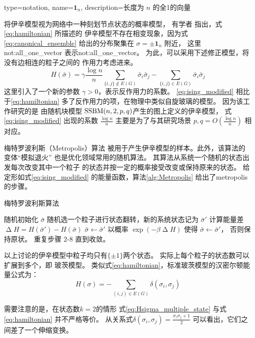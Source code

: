 {
  type=notation,
  name={\ensuremath{\mathbf{1}_n}},
  description={长度为 $n$ 的全1的向量}
}

将伊辛模型视为网络中一种刻划节点状态的概率模型，
有学者\cite{ye2020exact}
指出，式\eqref{eq:hamiltonian} 所描述的
伊辛模型不存在相变现象，因为式\eqref{eq:canonical_ensemble}
给出的分布聚集在 $\sigma=\pm \mathbf{1}_n$ 附近，
这里 \gls{not:all_one_vector} 表示\glsdesc{not:all_one_vector}。
为此，可以采用下述修正模型，将没有边相连的粒子之间的
作用力考虑进来。
\begin{equation}\label{eq:ising_modified}
  H(\bar{\sigma}) = \gamma \frac{\log n}{n} \sum_{\{i,j\}\not\in E(G)}
  \bar{\sigma}_i  \bar{\sigma}_j
	- \sum_{\{i,j\}\in E(G)}
  \bar{\sigma}_i  \bar{\sigma}_j
\end{equation}
这里引入了一个新的参数 $\gamma > 0$，表示反作用力的系数。
\eqref{eq:ising_modified}
相比于\eqref{eq:hamiltonian}
多了反作用力的项，在物理中类似自旋玻璃的模型\cite{lenka2016physics}。
因为该工作研究的是
由随机块模型 $\operatorname{SSBM}(n,2,p,q)$产生的图上定义的伊辛模型，
式\eqref{eq:ising_modified} 出现的系数
$\frac{\log n}{n}$
主要是为了与其研究场景 $p,q=O\left(\frac{\log n}{n} \right)$
相对应。


梅特罗波利斯（Metropolis）算法\cite{metropolis1953equation}
被用于产生伊辛模型的样本。此外，该算法的变体“模拟退火”
\cite{pincus1970monte} 也是优化领域常用的随机算法。
其算法从系统一个随机的状态出发每次改变其中一个粒子
的状态并按一定的概率接受改变或保持原来的状态。
给定形如式\eqref{eq:ising_modified}
的能量函数，算法\ref{alg:Metropolis}
给出了\gls{metropolis}的步骤。

\begin{algorithm}
  \caption{梅特罗波利斯算法}\label{alg:Metropolis}
  \begin{algorithmic}[1]
    \STATE 随机初始化 $\bar{\sigma}$
    \STATE 随机选一个粒子进行状态翻转，新的系统状态记为 $\bar{\sigma}'$ 
    \STATE 计算能量差 $\upDelta H= H(\bar{\sigma}') - H(\bar{\sigma})$
    \STATE $\bar{\sigma} \leftarrow \bar{\sigma}'$
    \ELSE
    \STATE 以概率 $\exp(-\beta \upDelta H)$ 
    使得 $\bar{\sigma} \leftarrow \bar{\sigma}'$，
    否则保持原状。 
    \ENDIF
    \STATE 重复步骤 2-8 直到收敛。
\end{algorithmic}  
\end{algorithm}

以上讨论的伊辛模型中粒子均只有$\{\pm 1\}$两个状态。
实际上每个粒子的状态数可以扩展到多个，即 玻茨模型\cite{potts1952some}。
类似式\eqref{eq:hamiltonian}，标准玻茨模型的汉密尔顿能量公式为：
\begin{equation}\label{eq:Hsigma_multiple_state}
  H(\sigma) = -\sum_{(i,j) \in E(G)}\delta(\sigma_i, \sigma_j)
\end{equation}
\begin{remark}\label{rem:equivalence_H_energy}
需要注意的是，在状态数$k=2$的情形
式\eqref{eq:Hsigma_multiple_state} 
与式\eqref{eq:hamiltonian}
并不严格等价。
从关系式$\delta(\sigma_i, \sigma_j) = \frac{\sigma_i \sigma_j + 1}{2}$
可以看出，它们之间差了一个伸缩变换。
\end{remark}

